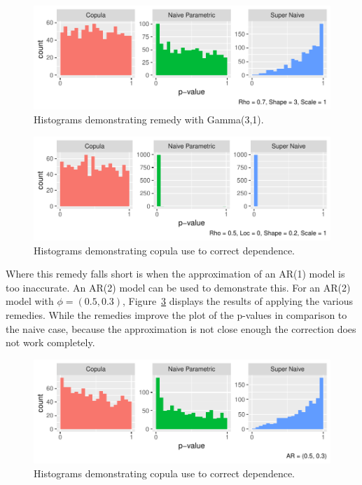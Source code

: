 \documentclass[12pt, letterpaper, titlepage]{article}
\begin{document}
\begin{figure}[tbp]
  \centering
  \includegraphics{hist_copula_gamma}
  \caption{Histograms demonstrating remedy with Gamma(3,1).}
  \label{fig:hist_copula_gamma}
\end{figure}

\begin{figure}[tbp]
  \centering
  \includegraphics{hist_copula_gev}
  \caption{Histograms demonstrating copula use to correct dependence.}
  \label{fig:hist_copula_gev}
\end{figure}

Where this remedy falls short is when the approximation of an AR(1) model is too inaccurate.
An AR(2) model can be used to demonstrate this. For an AR(2) model with $\phi = (0.5, 0.3)$,
Figure~\ref{fig:hist_copula_ar2} displays the results of applying the various remedies. 
While the remedies improve the plot of the p-values in comparison to the naive case,
because the approximation is not close enough the correction does not work completely.

\begin{figure}[tbp]
  \centering
  \includegraphics{hist_copula_ar2}
  \caption{Histograms demonstrating copula use to correct dependence.}
  \label{fig:hist_copula_ar2}
\end{figure}
\end{document}
